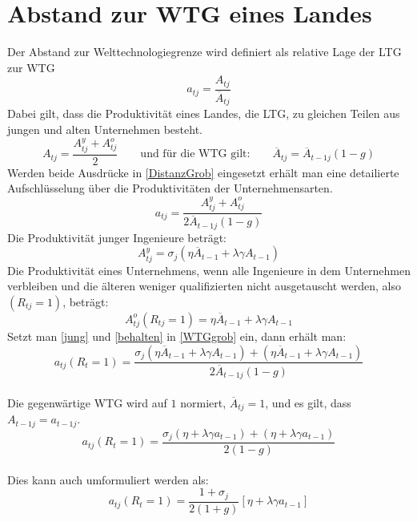 \section{Abstand zur WTG eines Landes}\label{sec:Abstand WTG}
Der Abstand zur Welttechnologiegrenze wird definiert als relative Lage der LTG zur WTG
\begin{equation}
a_{tj}=\frac{A_{tj}}{\overline{A}_{tj}}\label{DistanzGrob}
\end{equation}
Dabei gilt, dass die Produktivität eines Landes, die LTG, zu gleichen Teilen aus jungen und alten Unternehmen besteht. 
\begin{equation*}
A_{tj}=\frac{A_{tj}^y+A_{tj}^o}{2} \qquad \text{und für die WTG gilt:}\qquad \overline{A}_{tj}= \overline{A}_{t-1j}(1-g)
\end{equation*}
Werden beide Ausdrücke in \eqref{DistanzGrob} eingesetzt erhält man eine detailierte Aufschlüsselung über die Produktivitäten der Unternehmensarten.  
\begin{equation}
a_{tj}=\frac{A_{tj}^y+A_{tj}^o}{2\overline{A}_{t-1j}(1-g)}\label{WTGgrob}
\end{equation}
Die Produktivität junger Ingenieure beträgt: 
\begin{equation}
A_{tj}^{y}=\sigma_j(\eta\overline{A}_{t-1}+\lambda\gamma A_{t-1})\label{jung}
\end{equation}
Die Produktivität eines Unternehmens, wenn alle Ingenieure in dem Unternehmen verbleiben und die älteren weniger qualifizierten nicht ausgetauscht werden, also $(R_{tj}=1)$, beträgt: 
\begin{equation}
A_{tj}^{o}(R_{tj}=1)=\eta\overline{A}_{t-1}+\lambda\gamma A_{t-1}\label{behalten}
\end{equation}
Setzt man \eqref{jung} und \eqref{behalten} in \eqref{WTGgrob} ein, dann erhält man:
\begin{equation}
a_{tj}(R_{t}=1)=\frac{\sigma_j(\eta\overline{A}_{t-1}+\lambda\gamma A_{t-1})+(\eta\overline{A}_{t-1}+\lambda\gamma A_{t-1})}{2\overline{A}_{t-1j}(1-g)}
\end{equation}
\\
Die gegenwärtige WTG wird auf $1$ normiert, $\overline{A}_{tj}=1$, und es gilt, dass $A_{t-1j}=a_{t-1j}$.
\begin{equation}
a_{tj}(R_{t}=1)=\frac{\sigma_j(\eta+\lambda\gamma a_{t-1})+(\eta + \lambda\gamma a_{t-1})}{2(1-g)}
\end{equation}  
\\
Dies kann auch umformuliert werden als:
\begin{equation}
\boxed{a_{tj}(R_{t}=1)=\frac{1+\sigma_j}{2(1+g)}[\eta+\lambda \gamma a_{t-1}]}
\end{equation}
